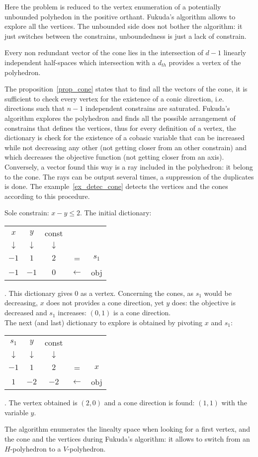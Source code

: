 Here the problem is reduced to the vertex enumeration of a potentially unbounded polyhedon in the positive orthant. Fukuda's algorithm allows to explore all the vertices. The unbounded side does not bother the algorithm: it just switches between the constrains, unboundedness is just a lack of constrain.

\begin{proposition}
Every non redundant vector of the cone lies in the intersection of $d-1$ linearly independent half-spaces which intersection with a $d_{th}$ provides a vertex of the polyhedron.
\label{prop_cone}
\end{proposition}

The proposition~\ref{prop_cone} states that to find all the vectors of the cone, it is sufficient to check every vertex for the existence of a conic direction, i.e. directions such that $n-1$ independent constrains are saturated. Fukuda's algorithm explores the polyhedron and finds all the possible arrangement of constrains that defines the vertices, thus for every definition of a vertex, the dictionary is check for the existence of a cobasic variable that can be increased while not decreasing any other (not getting closer from an other constrain) and which decreases the objective function (not getting closer from an axis). Conversely, a vector found this way is a ray included in the polyhedron: it belong to the cone. The rays can be output several times, a suppression of the duplicates is done. The example~\ref{ex_detec_cone} detects the vertices and the cones according to this procedure.

\begin{example}
	Sole constrain: $x-y\leq 2$.
	The initial dictionary:
	\begin{tabular}{| c | c || c || c c |}
	\hline	
	$x$ & $y$ & const & & \\
	$\downarrow$ & $\downarrow$ &$\downarrow$  & & \\
	\hline
	\hline		
   	$-1$ & $1$ & $2$ & = & $s_1$\\ \hline \hline	
   	$-1$ & $-1$ & $0$ & $\leftarrow$ & obj  \\
   	\hline
   	\end{tabular}. This dictionary gives $0$ as a vertex. Concerning the cones, as $s_1$ would be decreasing, $x$ does not provides a cone direction, yet $y$ does: the objective is decreased and $s_1$ increases: $(0,1)$ is a cone direction.\\
   	The next (and last) dictionary to explore is obtained by pivoting $x$ and $s_1$:
   	\begin{tabular}{| c | c || c || c c |}
	\hline	
	$s_1$ & $y$ & const & & \\
	$\downarrow$ & $\downarrow$ &$\downarrow$  & & \\
	\hline
	\hline		
   	$-1$ & $1$ & $2$ & = & $x$\\ \hline \hline	
   	$1$ & $-2$ & $-2$ & $\leftarrow$ & obj  \\
   	\hline
   	\end{tabular}
   	\label{ex_detec_cone}. The vertex obtained is $(2,0)$ and a cone direction is found: $(1,1)$ with the variable $y$.
\end{example}

The algorithm enumerates the linealty space when looking for a first vertex, and the cone and the vertices during Fukuda's algorithm: it allows to switch from an $H$-polyhedron to a $V$-polyhedron.



